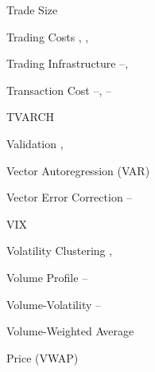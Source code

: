 \begin{multicols}{2}
{Trade Size \hfill \pageref{in:tradesize} \par

Trading Costs \hfill \pageref{in:tradecost1}, \pageref{in:tradecost2}, \pageref{in:tradecost3} \par

Trading Infrastructure \hfill \pageref{in:trad_infr1}--\pageref{in:trad_infr2}, \pageref{in:trad_infr3} \par%

Transaction Cost \hfill \pageref{in:transcost1}--\pageref{in:transcost2}, \pageref{in:transcost3}--\pageref{in:transcost4} \par

TVARCH \hfill \pageref{in:tvarch} \par

Validation \hfill \pageref{in:validation1}, \pageref{in:validation2} \par

Vector Autoregression (VAR) \hfill \pageref{in:var} \par

Vector Error Correction \hfill \pageref{in:vec1}--\pageref{in:vec2} \par 

VIX \hfill \pageref{in:vix} \par

Volatility Clustering \hfill \pageref{in:volclust1}, \pageref{in:volclust2} \par

Volume Profile \hfill \pageref{in:vol_prof1}--\pageref{in:vol_prof2} \par

Volume-Volatility \hfill \pageref{in:volvol1}--\pageref{in:volvol2} \par

Volume-Weighted Average \hfill \pageref{in:vwap} \par \hspace{0.25cm} Price (VWAP) \par

}
\end{multicols}